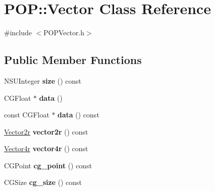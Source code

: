 \hypertarget{class_p_o_p_1_1_vector}{}\section{P\+OP\+:\+:Vector Class Reference}
\label{class_p_o_p_1_1_vector}


{\ttfamily \#include $<$P\+O\+P\+Vector.\+h$>$}

\subsection*{Public Member Functions}
\begin{DoxyCompactItemize}
\item 
\mbox{\label{class_p_o_p_1_1_vector_a5c8659e4f2851f2850940385bd3813e1}} 
N\+S\+U\+Integer {\bfseries size} () const
\item 
\mbox{\label{class_p_o_p_1_1_vector_a94715b4c14dc8492f0c46f18abc0e5c8}} 
C\+G\+Float $\ast$ {\bfseries data} ()
\item 
\mbox{\label{class_p_o_p_1_1_vector_a04a5181b9f4c31f795893bf98c69736b}} 
const C\+G\+Float $\ast$ {\bfseries data} () const
\item 
\mbox{\label{class_p_o_p_1_1_vector_a3bc32a4174d61b7ada973bc0f874cb98}} 
\mbox{\hyperlink{struct_p_o_p_1_1_vector2}{Vector2r}} {\bfseries vector2r} () const
\item 
\mbox{\label{class_p_o_p_1_1_vector_accabfbab0fa4b930766919190f7a72d1}} 
\mbox{\hyperlink{struct_p_o_p_1_1_vector4}{Vector4r}} {\bfseries vector4r} () const
\item 
\mbox{\label{class_p_o_p_1_1_vector_a5ef0a612c5de21feadfce250de88f2ce}} 
C\+G\+Point {\bfseries cg\+\_\+point} () const
\item 
\mbox{\label{class_p_o_p_1_1_vector_ae35edcf895ec6034e4472b02e7ef38ea}} 
C\+G\+Size {\bfseries cg\+\_\+size} () const
\item 
\mbox{\label{class_p_o_p_1_1_vector_affa7437c791d44704ab0310240966e77}} 

\end{DoxyCompactItemize}
